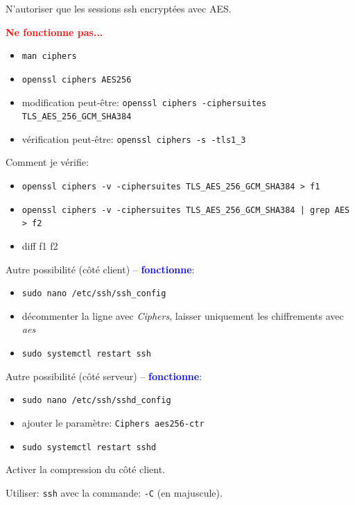 \documentclass[a4paper]{article}
\begin{document}
\begin{itemize}
\item N'autoriser que les sessions ssh encryptées avec AES.
\begin{example}
    \textcolor{red}{\textbf{Ne fonctionne pas...}}
    \begin{itemize}
        \item \texttt{man ciphers}
        \item \texttt{openssl ciphers AES256}
        \item modification peut-être: \texttt{openssl ciphers -ciphersuites TLS\_AES\_256\_GCM\_SHA384}
        \item vérification peut-être: \texttt{openssl ciphers -s -tls1\_3}
    \end{itemize}
    \begin{example}
        Comment je vérifie:
        \begin{itemize}
            \item \texttt{openssl ciphers -v -ciphersuites TLS\_AES\_256\_GCM\_SHA384 > f1}
            \item \texttt{openssl ciphers -v -ciphersuites TLS\_AES\_256\_GCM\_SHA384 | grep AES > f2}
            \item diff f1 f2
        \end{itemize}
    \end{example}
    \item Autre possibilité (côté client) -- \textcolor{blue}{\textbf{fonctionne}}:
    \begin{itemize}
        \item \texttt{sudo nano /etc/ssh/ssh\_config}
        \item décommenter la ligne avec \textit{Ciphers}, laisser uniquement les chiffrements avec \textit{aes}
        \item \texttt{sudo systemctl restart ssh}
    \end{itemize}
    \item Autre possibilité (côté serveur) -- \textcolor{blue}{\textbf{fonctionne}}:
    \begin{itemize}
        \item \texttt{sudo nano /etc/ssh/sshd\_config}
        \item ajouter le paramètre: \texttt{Ciphers aes256-ctr}
        \item \texttt{sudo systemctl restart sshd}
    \end{itemize}
\end{example}

\item Activer la compression du côté client.
\begin{example}
    Utiliser: \texttt{ssh} avec la commande: \texttt{-C} (en majuscule).
\end{example}


\end{itemize}
\end{document}
